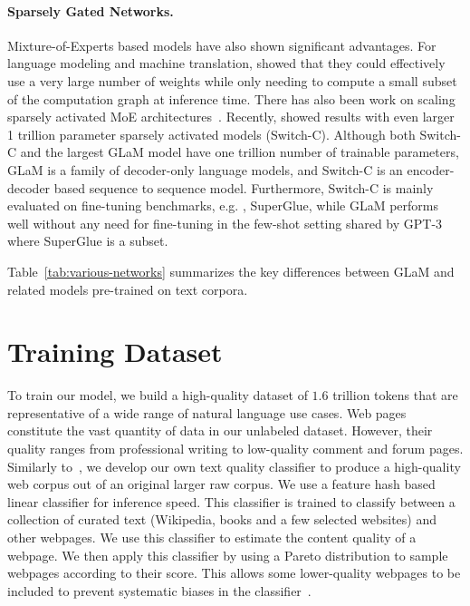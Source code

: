 \paragraph{Sparsely Gated Networks.} Mixture-of-Experts based models have also shown significant advantages. For language modeling and machine translation, \citet{shazeer2017outrageously} showed that they could effectively use a very large number of weights while only needing to compute a small subset of the computation graph at inference time. There has also been work on scaling sparsely activated MoE architectures~\cite{hestness2017deep,shazeer2018mesh,lepikhin2020gshard, kudugunta2021beyond}. Recently, \citet{fedus2021switch} showed results with even larger 1 trillion parameter sparsely activated models (Switch-C). Although both  Switch-C and the largest GLaM model have one trillion number of trainable parameters, GLaM is a family of decoder-only language models, and Switch-C is an encoder-decoder based sequence to sequence model. Furthermore, Switch-C is mainly evaluated on fine-tuning benchmarks, e.g. , SuperGlue, while GLaM performs well without any need for fine-tuning in the few-shot setting shared by GPT-3 where SuperGlue is a subset.

Table~\ref{tab:various-networks} summarizes the key differences between GLaM and related models pre-trained on text corpora. 

\section{Training Dataset}
\label{sec:data}

To train our model, we  build a high-quality dataset of $1.6$ trillion tokens that are representative of a wide range of natural language use cases. Web pages constitute the vast quantity of data in our unlabeled dataset. However, their quality ranges from professional writing to low-quality comment and forum pages. Similarly to~\citet{NEURIPS2020_gpt3}, we develop our own text quality classifier to produce a high-quality web corpus out of an original larger raw corpus. We use a feature hash based linear classifier for inference speed. This classifier is trained to classify between a collection of curated text (Wikipedia, books and a few selected websites) and other webpages. We use this classifier to estimate the content quality of a webpage. We then apply this classifier by using a Pareto distribution to sample webpages according to their score. This allows some lower-quality webpages to be included to prevent systematic biases in the classifier~\cite{NEURIPS2020_gpt3}.

